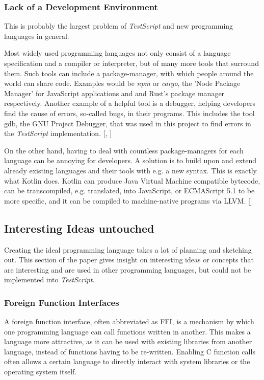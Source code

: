 \documentclass[12pt,a4paper]{article}
\newcommand{\name}{\emph{TestScript}}
\begin{document}
\subsubsection{Lack of a Development Environment}
This is probably the largest problem of \name{} and new programming
languages in general.

Most widely used programming languages not only consist
of a language specification and a compiler or interpreter, but of many more
tools that surround them.
Such tools can include a package-manager, with which people around the world
can share code. Examples would be \emph{npm} or \emph{cargo}, 
the 'Node Package Manager' for JavaScript applications and and Rust's package 
manager respectively.
Another example of a helpful tool is a debugger, helping developers
find the cause of errors, so-called bugs, in their programs.
This includes the tool gdb, the GNU Project Debugger, that was used in this
project to find errors in the \name{} implementation.
[, ]

On the other hand, having to deal with countless package-managers for each
language can be annoying for developers. A solution is to build upon and
extend already existing languages and their tools with e.g. a new syntax.
This is exactly what Kotlin does. Kotlin can produce Java Virtual Machine
compatible bytecode, can be transcompiled, e.g. translated, into
JavaScript, or ECMAScript 5.1 to be more specific,
and it can be compiled to machine-native programs via LLVM. 
[]


\subsection{Interesting Ideas untouched}
Creating the ideal programming language takes a lot of planning and sketching
out. This section of the paper gives insight on interesting ideas or concepts
that are interesting and are used in other programming languages, but 
could not be implemented into \name{}.

\subsubsection{Foreign Function Interfaces}
A foreign function interface, often abbreviated as FFI,
is a mechanism by which one programming language can call functions written 
in another. This makes a language more attractive, as it can be used with
existing libraries from another language, instead of functions having to be
re-written. Enabling C function calls often allows a certain language to
directly interact with system libraries or the operating system itself.
\end{document}
